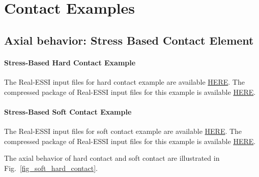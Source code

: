\clearpage
\newpage
\section{Contact Examples}
\label{Contact_Examples}
\subsection{ Axial behavior: Stress Based Contact Element}


\paragraph{Stress-Based Hard Contact Example}
The Real-ESSI input files for hard contact example are available 
\href{https://github.com/yuan-energy/Real-ESSI-Short-Course-Examples/tree/master/short-course-examples/Day3/Contact_Examples/axial/HardContact_Elastic_Perfectly_Plastic_Shear_Model}{HERE}. 
The compressed package of Real-ESSI input files for this example is available 
\href{https://github.com/yuan-energy/Real-ESSI-Short-Course-Examples/blob/master/short-course-examples/Day3/Contact_Examples/axial/HardContact_Elastic_Perfectly_Plastic_Shear_Model/HardContact_Elastic_Perfectly_Plastic_Shear_Model.tgz?raw=true}{HERE}. 

\paragraph{Stress-Based Soft Contact Example}
The Real-ESSI input files for soft contact example are available 
\href{https://github.com/yuan-energy/Real-ESSI-Short-Course-Examples/tree/master/short-course-examples/Day3/Contact_Examples/axial/SoftContact_Elastic_Perfectly_Plastic_Shear_Model}{HERE}. 
The compressed package of Real-ESSI input files for this example is available 
\href{https://github.com/yuan-energy/Real-ESSI-Short-Course-Examples/blob/master/short-course-examples/Day3/Contact_Examples/axial/SoftContact_Elastic_Perfectly_Plastic_Shear_Model/SoftContact_Elastic_Perfectly_Plastic_Shear_Model.tgz?raw=true}{HERE}. 


The axial behavior of hard contact and soft contact are illustrated in Fig.~\ref{fig_soft_hard_contact}.



